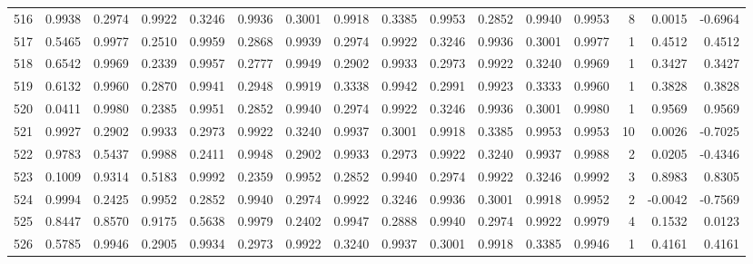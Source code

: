 \begin{tabular}{lrrrrrrrrrrrrrrr}
516 &      0.9938 &  0.2974 &  0.9922 &  0.3246 &  0.9936 &  0.3001 &  0.9918 &  0.3385 &  0.9953 &  0.2852 &   0.9940 &     0.9953 &      8 &                    0.0015 &                    -0.6964 \\
517 &      0.5465 &  0.9977 &  0.2510 &  0.9959 &  0.2868 &  0.9939 &  0.2974 &  0.9922 &  0.3246 &  0.9936 &   0.3001 &     0.9977 &      1 &                    0.4512 &                     0.4512 \\
518 &      0.6542 &  0.9969 &  0.2339 &  0.9957 &  0.2777 &  0.9949 &  0.2902 &  0.9933 &  0.2973 &  0.9922 &   0.3240 &     0.9969 &      1 &                    0.3427 &                     0.3427 \\
519 &      0.6132 &  0.9960 &  0.2870 &  0.9941 &  0.2948 &  0.9919 &  0.3338 &  0.9942 &  0.2991 &  0.9923 &   0.3333 &     0.9960 &      1 &                    0.3828 &                     0.3828 \\
520 &      0.0411 &  0.9980 &  0.2385 &  0.9951 &  0.2852 &  0.9940 &  0.2974 &  0.9922 &  0.3246 &  0.9936 &   0.3001 &     0.9980 &      1 &                    0.9569 &                     0.9569 \\
521 &      0.9927 &  0.2902 &  0.9933 &  0.2973 &  0.9922 &  0.3240 &  0.9937 &  0.3001 &  0.9918 &  0.3385 &   0.9953 &     0.9953 &     10 &                    0.0026 &                    -0.7025 \\
522 &      0.9783 &  0.5437 &  0.9988 &  0.2411 &  0.9948 &  0.2902 &  0.9933 &  0.2973 &  0.9922 &  0.3240 &   0.9937 &     0.9988 &      2 &                    0.0205 &                    -0.4346 \\
523 &      0.1009 &  0.9314 &  0.5183 &  0.9992 &  0.2359 &  0.9952 &  0.2852 &  0.9940 &  0.2974 &  0.9922 &   0.3246 &     0.9992 &      3 &                    0.8983 &                     0.8305 \\
524 &      0.9994 &  0.2425 &  0.9952 &  0.2852 &  0.9940 &  0.2974 &  0.9922 &  0.3246 &  0.9936 &  0.3001 &   0.9918 &     0.9952 &      2 &                   -0.0042 &                    -0.7569 \\
525 &      0.8447 &  0.8570 &  0.9175 &  0.5638 &  0.9979 &  0.2402 &  0.9947 &  0.2888 &  0.9940 &  0.2974 &   0.9922 &     0.9979 &      4 &                    0.1532 &                     0.0123 \\
526 &      0.5785 &  0.9946 &  0.2905 &  0.9934 &  0.2973 &  0.9922 &  0.3240 &  0.9937 &  0.3001 &  0.9918 &   0.3385 &     0.9946 &      1 &                    0.4161 &                     0.4161 \\

\end{tabular}
